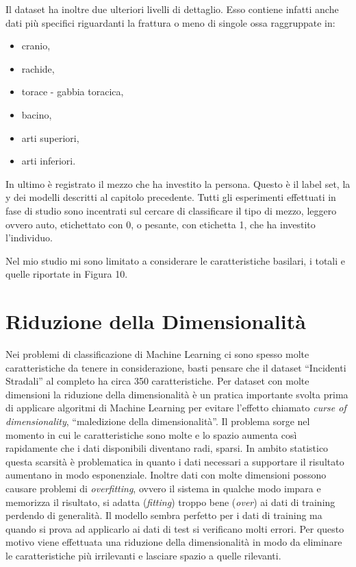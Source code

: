\documentclass[12pt,italian]{report}
\begin{document}
Il dataset ha inoltre due ulteriori livelli di dettaglio. Esso contiene infatti anche dati più specifici riguardanti la frattura o meno di singole ossa raggruppate in:
\begin{itemize}
	\item cranio,
	\item rachide,
	\item torace - gabbia toracica,
	\item bacino,
	\item arti superiori,
	\item arti inferiori.
\end{itemize}
In ultimo è registrato il mezzo che ha investito la persona. Questo è il label set, la y dei modelli descritti al capitolo precedente. Tutti gli esperimenti effettuati in fase di studio sono incentrati sul cercare di classificare il tipo di mezzo, leggero ovvero auto, etichettato con 0, o pesante, con etichetta 1, che ha investito l'individuo.

Nel mio studio mi sono limitato a considerare le caratteristiche basilari, i totali e quelle riportate in Figura 10.
\section{Riduzione della Dimensionalità}
\label{sec:riduzione}
Nei problemi di classificazione di Machine Learning ci sono spesso molte caratteristiche da tenere in considerazione, basti pensare che il dataset ``Incidenti Stradali'' al completo ha circa 350 caratteristiche. Per dataset con molte dimensioni la riduzione della dimensionalità è un pratica importante svolta prima di applicare algoritmi di Machine Learning per evitare l'effetto chiamato \textit{curse of dimensionality}, ``maledizione della dimensionalità''\cite{shalevshwartz2014understanding}. Il problema sorge nel momento in cui le caratteristiche sono molte e lo spazio aumenta così rapidamente che i dati disponibili diventano radi, sparsi. In ambito statistico questa scarsità è problematica in quanto i dati necessari a supportare il risultato aumentano in modo esponenziale.
Inoltre dati con molte dimensioni possono causare problemi di \textit{overfitting}, ovvero il sistema in qualche modo impara e memorizza il risultato, si adatta (\textit{fitting}) troppo bene (\textit{over}) ai dati di training perdendo di generalità. Il modello sembra perfetto per i dati di training ma quando si prova ad applicarlo ai dati di test si verificano molti errori.
Per questo motivo viene effettuata una riduzione della dimensionalità in modo da eliminare le caratteristiche più irrilevanti e lasciare spazio a quelle rilevanti. 
\end{document}

